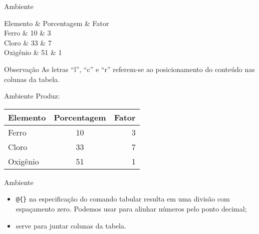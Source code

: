 \begin{frame}{Ambiente }
\begin{LaTeXcode}[Exemplo]
\n
Elemento   \&  Porcentagem \& Fator \string\\ \n
\string\hline\string\hline \n
Ferro      \&  10          \& 3     \string\\ \string\hline \n
Cloro      \&  33          \& 7     \string\\ \string\hline \n
Oxigênio   \&  51          \& 1     \string\\ \string\hline \n
{}
\end{LaTeXcode}

\begin{block}{Observação}
As letras ``l'', ``c'' e ``r'' referem-se ao posicionamento do conteúdo nas colunas da tabela.
\end{block}
\end{frame}

\begin{frame}{Ambiente }
\fontsize{10}{11}\selectfont
Produz:
\begin{LaTeXoutput}
\begin{tabular}{l|c|r}                   
\hline
Elemento    &  Porcentagem  & Fator \\ \hline \hline
Ferro   &  10   & 3     \\ \hline
Cloro   &  33   & 7     \\ \hline
Oxigênio  &  51   & 1 \\ \hline
\end{tabular}
\end{LaTeXoutput}
\end{frame}

\begin{frame}{Ambiente }
\begin{itemize}
\item \texttt{@\{\}} na especificação do comando tabular resulta em uma divisão com espaçamento zero. Podemos usar para alinhar números pelo ponto decimal;
\item {} serve para juntar colunas da tabela.
\end{itemize}
\end{frame}

